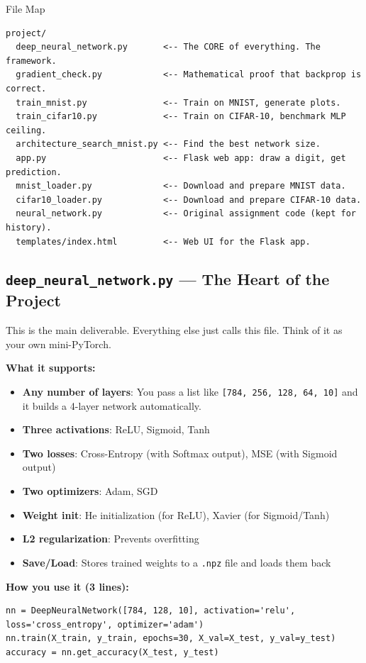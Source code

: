 \documentclass[12pt, a4paper]{article}
\begin{document}
\begin{conceptbox}{File Map}
\begin{verbatim}
project/
  deep_neural_network.py       <-- The CORE of everything. The framework.
  gradient_check.py            <-- Mathematical proof that backprop is correct.
  train_mnist.py               <-- Train on MNIST, generate plots.
  train_cifar10.py             <-- Train on CIFAR-10, benchmark MLP ceiling.
  architecture_search_mnist.py <-- Find the best network size.
  app.py                       <-- Flask web app: draw a digit, get prediction.
  mnist_loader.py              <-- Download and prepare MNIST data.
  cifar10_loader.py            <-- Download and prepare CIFAR-10 data.
  neural_network.py            <-- Original assignment code (kept for history).
  templates/index.html         <-- Web UI for the Flask app.
\end{verbatim}
\end{conceptbox}

\subsection{\texttt{deep\_neural\_network.py} --- The Heart of the Project}

This is the main deliverable. Everything else just calls this file. Think of it as your own mini-PyTorch.

\textbf{What it supports:}
\begin{itemize}
  \item \textbf{Any number of layers}: You pass a list like \texttt{[784, 256, 128, 64, 10]} and it builds a 4-layer network automatically.
  \item \textbf{Three activations}: ReLU, Sigmoid, Tanh
  \item \textbf{Two losses}: Cross-Entropy (with Softmax output), MSE (with Sigmoid output)
  \item \textbf{Two optimizers}: Adam, SGD
  \item \textbf{Weight init}: He initialization (for ReLU), Xavier (for Sigmoid/Tanh)
  \item \textbf{L2 regularization}: Prevents overfitting
  \item \textbf{Save/Load}: Stores trained weights to a \texttt{.npz} file and loads them back
\end{itemize}

\textbf{How you use it (3 lines):}
\begin{lstlisting}
nn = DeepNeuralNetwork([784, 128, 10], activation='relu', loss='cross_entropy', optimizer='adam')
nn.train(X_train, y_train, epochs=30, X_val=X_test, y_val=y_test)
accuracy = nn.get_accuracy(X_test, y_test)
\end{lstlisting}
\end{document}
